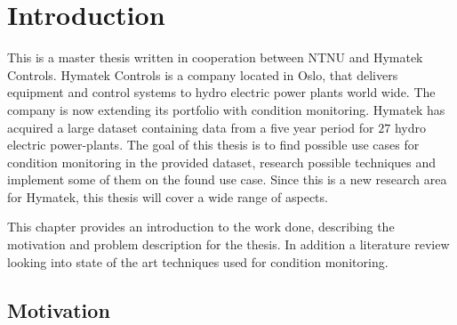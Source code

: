\chapter{Introduction}\label{cha:introduction}
%

This is a master thesis written in cooperation between NTNU and Hymatek Controls. Hymatek Controls is a company located in Oslo, that delivers equipment and control systems to hydro electric power plants world wide. The company is now extending its portfolio with condition monitoring. Hymatek has acquired a large dataset containing data from a five year period for $27$ hydro electric power-plants. The goal of this thesis is to find possible use cases for condition monitoring in the provided dataset, research possible techniques and implement some of them on the found use case. Since this is a new research area for Hymatek, this thesis will cover a wide range of aspects. 

This chapter provides an introduction to the work done, describing the motivation and problem description for the thesis. In addition a literature review looking into state of the art techniques used for condition monitoring. 


\section{Motivation}\label{sec:motivation}


